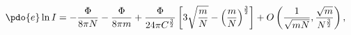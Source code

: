 \begin{equation}
\label{Eq_A40}
\pdo{e} \ln I
  = - \frac{\Phi}{8 \pi N} - \frac{\Phi}{8 \pi m}
  + \frac{\Phi}{24\pi C^{\frac{3}{2}}}
  \left[
  3 \sqrt{\frac{m}{N}} - \left(\frac{m}{N}\right)^{\frac{3}{2}}
  \right]
  + O\left(\frac{1}{\sqrt{mN}},\frac{\sqrt{m}}{N^{\frac{3}{2}}}\right),     
\end{equation}

